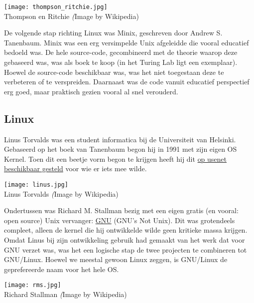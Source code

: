   \begin{marginfigure}
\texttt{[image: thompson\_ritchie.jpg]}\\
    Thompson en Ritchie {\scriptsize\emph (Image by Wikipedia)}\\[3mm]
  \end{marginfigure}

De volgende stap richting Linux was Minix, geschreven door Andrew S. Tanenbaum. Minix was een erg versimpelde Unix afgeleidde die vooral educatief bedoeld was. De hele source-code, gecombineerd met de theorie waarop deze gebaseerd was, was als boek te koop (in het Turing Lab ligt een exemplaar). Hoewel de source-code beschikbaar was, was het niet toegestaan deze te verbeteren of te verspreiden. Daarnaast was de code vanuit educatief perspectief erg goed, maar praktisch gezien vooral al snel verouderd.

\subsection{Linux}\label{linux}

Linus Torvalds was een student informatica bij de Universiteit van Helsinki. Gebaseerd op het boek van Tanenbaum begon hij in 1991 met zijn eigen OS Kernel. Toen dit een beetje vorm begon te krijgen heeft hij dit \href{https://www.cs.cmu.edu/~awb/linux.history.html}{op usenet beschikbaar gesteld} voor wie er iets mee wilde.

  \begin{marginfigure}
\texttt{[image: linus.jpg]}\\
    Linus Torvalds {\scriptsize\emph (Image by Wikipedia)}\\[3mm]
  \end{marginfigure}

Ondertussen was Richard M. Stallman bezig met een eigen gratis (en vooral: open source) Unix vervanger: \href{https://www.gnu.org/}{GNU} (GNU's Not Unix). Dit was grotendeels compleet, alleen de kernel die hij ontwikkelde wilde geen kritieke massa krijgen. Omdat Linus bij zijn ontwikkeling gebruik had gemaakt van het werk dat voor GNU verzet was, was het een logische stap de twee projecten te combineren tot GNU/Linux. Hoewel we meestal gewoon Linux zeggen, is GNU/Linux de geprefereerde naam voor het hele OS.

  \begin{marginfigure}
\texttt{[image: rms.jpg]}\\
    Richard Stallman {\scriptsize\emph (Image by Wikipedia)}\\[3mm]
  \end{marginfigure}

